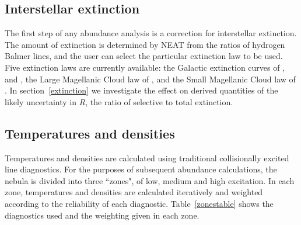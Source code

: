 \documentclass[useAMS,usenatbib]{mn2e}
\begin{document}
\subsection{Interstellar extinction}

The first step of any abundance analysis is a correction for interstellar extinction.  The amount of extinction is determined by NEAT from the ratios of hydrogen Balmer lines, and the user can select the particular extinction law to be used.  Five extinction laws are currently available: the Galactic extinction curves of \citet{1983MNRAS.203..301H}, \citet{1990ApJS...72..163F} and \citet{1989ApJ...345..245C}, the Large Magellanic Cloud law of \citet{1983MNRAS.203..301H}, and the Small Magellanic Cloud law of \citet{1984A&A...132..389P}.  In section~\ref{extinction} we investigate the effect on derived quantities of the likely uncertainty in $R$, the ratio of selective to total extinction.

\subsection{Temperatures and densities}

Temperatures and densities are calculated using traditional collisionally excited line diagnostics.  For the purposes of subsequent abundance calculations, the nebula is divided into three ``zones", of low, medium and high excitation.  In each zone, temperatures and densities are calculated iteratively and weighted according to the reliability of each diagnostic.  Table~\ref{zonestable} shows the diagnostics used and the weighting given in each zone.
\end{document}
